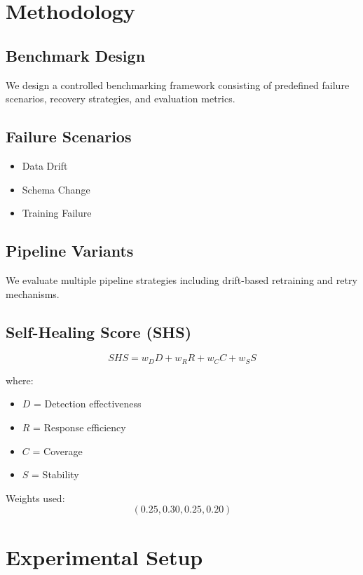 \documentclass[conference]{IEEEtran}
\begin{document}
\section{Methodology}

\subsection{Benchmark Design}
We design a controlled benchmarking framework consisting of predefined failure scenarios, recovery strategies, and evaluation metrics.

\subsection{Failure Scenarios}
\begin{itemize}
    \item Data Drift
    \item Schema Change
    \item Training Failure
\end{itemize}

\subsection{Pipeline Variants}
We evaluate multiple pipeline strategies including drift-based retraining and retry mechanisms.

\subsection{Self-Healing Score (SHS)}

\begin{equation}
SHS = w_D D + w_R R + w_C C + w_S S
\end{equation}

where:
\begin{itemize}
    \item $D$ = Detection effectiveness
    \item $R$ = Response efficiency
    \item $C$ = Coverage
    \item $S$ = Stability
\end{itemize}

Weights used:
\[
(0.25, 0.30, 0.25, 0.20)
\]

\section{Experimental Setup}
\end{document}
